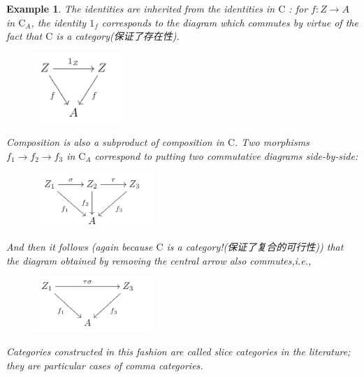 \documentclass[12pt]{book}
\theoremstyle{definition}\newtheorem{dfn}{Définition}[chapter]
\theoremstyle{plain}\newtheorem{thm}{Théorème}[chapter]
\theoremstyle{plain}\newtheorem{prp}{Proposition}[chapter]
\theoremstyle{plain}\newtheorem{lem}{\bf Lemme}[chapter]
\theoremstyle{plain}\newtheorem{axm}{\bf Axiome}[chapter]
\theoremstyle{plain}\newtheorem{lmm}{\bf Lemme}[chapter]
\theoremstyle{plain}\newtheorem{exm}{\bf Example}[chapter]
\theoremstyle{plain}\newtheorem{cor}{\bf Corollaire}[chapter]
\theoremstyle{remark}\newtheorem{rem}{Remarque}[chapter]
\begin{document}
\begin{exm}
The identities are inherited from the identities in $\mathrm{C}$ : for $f: Z \rightarrow A$ in $\mathrm{C}_{A}$, the identity $1_{f}$ corresponds to the diagram which commutes by virtue of the fact that $\mathrm{C}$ is a category(保证了存在性). 
\begin{figure}[H]\centering\includegraphics[width=0.3\textwidth]{image//Vocabulaire de theorie des ensembles//9}\end{figure}
Composition is also a subproduct of composition in $\mathrm{C}$. Two morphisms $f_{1} \rightarrow f_{2} \rightarrow f_{3}$ in $\mathrm{C}_{A}$ correspond to putting two commutative diagrams side-by-side:
\begin{figure}[H]\centering\includegraphics[width=0.4\textwidth]{image//Vocabulaire de theorie des ensembles//10}\end{figure}
And then it follows (again because $\mathrm{C}$ is a category!(保证了复合的可行性)) that the diagram obtained by removing the central arrow also commutes,i.e.,
\begin{figure}[H]\centering\includegraphics[width=0.4\textwidth]{image//Vocabulaire de theorie des ensembles//11}\end{figure}

Categories constructed in this fashion are called slice categories in the literature; they are particular cases of comma categories.
\end{exm}
\end{document}
